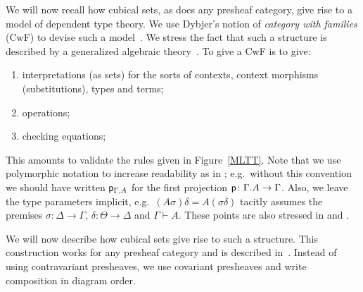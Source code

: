 \documentclass[10pt,a4paper]{article}
\newcommand{\pp}{{\sf p}}
\begin{document}
We will now recall how cubical sets, as does any presheaf category,
give rise to a model of dependent type theory.  We use Dybjer's notion
of \emph{category with families} (CwF) to devise such a
model~\cite{Dybjer,Curien,Hofmann}.  We stress the fact that such a
structure is described by a generalized algebraic
theory~\cite{Cartmell}.  To give a CwF is to give:
\begin{enumerate}
\item interpretations (as sets) for the sorts of contexts, context
  morphisms (substitutions), types and terms;
\item operations;
\item checking equations;
\end{enumerate}
This amounts to validate the rules given in Figure~\ref{MLTT}.  Note
that we use polymorphic notation to increase readability as in
\cite{Cartmell,Dybjer}; e.g.\ without this convention we should have
written $\pp_{\Gamma, A}$ for the first projection $\pp \colon
\Gamma.A \to \Gamma$.  Also, we leave the type parameters implicit,
e.g.\ $(A \sigma) \delta = A (\sigma \delta)$ tacitly assumes the
premises $\sigma \colon \Delta \to \Gamma$, $\delta \colon \Theta \to
\Delta$ and $\Gamma \vdash A$.  These points are also stressed in
\cite[Sec.~1]{VoevodskyCMU} and \cite{Dybjer}.

We will now describe how cubical sets give rise to such a structure.
This construction works for any presheaf category and is described
in~\cite[Sec.~4]{Hofmann}.  Instead of using contravariant presheaves,
we use covariant presheaves and write composition in diagram order.
\end{document}

